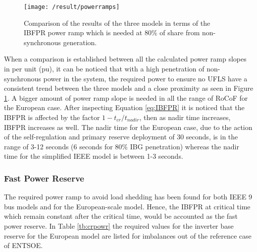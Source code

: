 \begin{figure}[h]
	\centering
	\texttt{[image: /result/powerramps]}
	\caption{Comparison of the results of the three models in terms of the IBFPR power ramp which is needed at 80\% of share from non-synchronous generation.}
	\label{fig:res_pramp}
\end{figure}

When a comparison is established between all the calculated power ramp slopes in per unit (pu), it can be noticed that with a high penetration of non-synchronous power in the system, the required power to ensure no UFLS have a consistent trend between the three models and a close proximity as seen in Figure \ref{fig:res_pramp}. A bigger amount of power ramp slope is needed in all the range of RoCoF for the European case. After inspecting Equation \ref{eq:IBFPR} it is noticed that the IBFPR is affected by the factor $ 1-t_{cr} /t_{nadir} $, then as nadir time increases, IBFPR increases as well. The nadir time for the European case, due to the action of the self-regulation and primary reserve deployment of 30 seconds, is in the range of 3-12 seconds (6 seconds for 80\% IBG penetration) whereas the nadir time for the simplified IEEE model is between 1-3 seconds.



\subsubsection{Fast Power Reserve}


The required power ramp  to avoid load shedding has been found for both IEEE 9 bus models and for the European-scale model. Hence, the IBFPR at critical time which remain constant after the critical time, would be accounted as the fast power reserve. In Table \ref{tb:crpowr} the required values for the inverter base reserve for the European model are listed for imbalances out of the reference case of ENTSOE.\\

